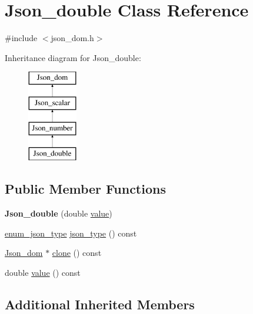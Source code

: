 \hypertarget{classJson__double}{}\section{Json\+\_\+double Class Reference}
\label{classJson__double}


{\ttfamily \#include $<$json\+\_\+dom.\+h$>$}

Inheritance diagram for Json\+\_\+double\+:\begin{figure}[H]
\begin{center}
\leavevmode
\includegraphics[height=4.000000cm]{classJson__double}
\end{center}
\end{figure}
\subsection*{Public Member Functions}
\begin{DoxyCompactItemize}
\item 
\mbox{\label{classJson__double_adae8144cec21af68129edab3f70b976e}} 
{\bfseries Json\+\_\+double} (double \mbox{\hyperlink{classJson__double_ab9919eeb72c3604f67a1a88804eb5734}{value}})
\item 
\mbox{\hyperlink{classJson__dom_af37eed7dfe1da1d6507d3ab85320eb03}{enum\+\_\+json\+\_\+type}} \mbox{\hyperlink{classJson__double_af10b0251a6a1bdc530a2a6928b2396b4}{json\+\_\+type}} () const
\item 
\mbox{\hyperlink{classJson__dom}{Json\+\_\+dom}} $\ast$ \mbox{\hyperlink{classJson__double_a2df30c0e413cebf858b13b8ce2f9f91c}{clone}} () const
\item 
double \mbox{\hyperlink{classJson__double_ab9919eeb72c3604f67a1a88804eb5734}{value}} () const
\end{DoxyCompactItemize}
\subsection*{Additional Inherited Members}


